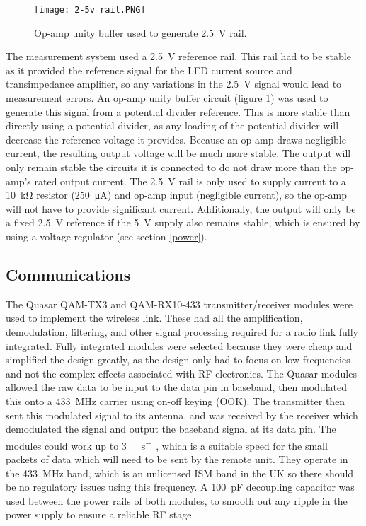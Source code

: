 \begin{figure}[htbp]
	\centering
	\texttt{[image: 2-5v rail.PNG]}
	\caption{Op-amp unity buffer used to generate \SI{2.5}{\volt} rail.}
	\label{fig: 2.5v rail}
\end{figure}

The measurement system used a \SI{2.5}{\volt} reference rail. This rail had to be stable as it provided the reference signal for the LED current source and transimpedance amplifier, so any variations in the \SI{2.5}{\volt} signal would lead to measurement errors. An op-amp unity buffer circuit (figure \ref{fig: 2.5v rail}) was used to generate this signal from a potential divider reference. This is more stable than directly using a potential divider, as any loading of the potential divider will decrease the reference voltage it provides. Because an op-amp draws negligible current, the resulting output voltage will be much more stable. The output will only remain stable the circuits it is connected to do not draw more than the op-amp's rated output current. The \SI{2.5}{\volt} rail is only used to supply current to a \SI{10}{\kilo\ohm} resistor (\SI{250}{\micro\ampere}) and op-amp input (negligible current), so the op-amp will not have to provide significant current. Additionally, the output will only be a fixed \SI{2.5}{\volt} reference if the \SI{5}{\volt} supply also remains stable, which is ensured by using a voltage regulator (see section \ref{power}).\\





\subsection{Communications}
The Quasar QAM-TX3 \cite{qam-tx} and QAM-RX10-433 \cite{qam-rx} transmitter/receiver modules were used to implement the wireless link. These had all the amplification, demodulation, filtering, and other signal processing required for a radio link fully integrated. Fully integrated modules were selected because they were cheap and simplified the design greatly, as the design only had to focus on low frequencies and not the complex effects associated with RF electronics. The Quasar modules allowed the raw data to be input to the data pin in baseband, then modulated this onto a \SI{433}{\mega\hertz} carrier using on-off keying (OOK). The transmitter then sent this modulated signal to its antenna, and was received by the receiver which demodulated the signal and output the baseband signal at its data pin. The modules could work up to \SI{3}{\kilo\bit\per\second}, which is a suitable speed for the small packets of data which will need to be sent by the remote unit. They operate in the \SI{433}{\mega\hertz} band, which is an unlicensed ISM band in the UK \cite{ism_band} so there should be no regulatory issues using this frequency. A \SI{100}{\pico\farad} decoupling capacitor was used between the power rails of both modules, to smooth out any ripple in the power supply to ensure a reliable RF stage.\\





